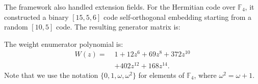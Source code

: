 The framework also handled extension fields. For the Hermitian code over $\mathbb{F}_4$, it constructed a binary $[15,5,6]$ code self-orthogonal embedding starting from a random $[10,5]$ code. The resulting generator matrix is:
\begin{center}
\end{center}
The weight enumerator polynomial is:
\begin{align*}
W(z) =\; & 1 + 12z^6 + 69z^8 + 372z^{10} \\
&+ 402z^{12} + 168z^{14}.
\end{align*}
Note that we use the notation $\{0, 1, \omega, \omega^2\}$ for elements of $\mathbb{F}_4$, where $\omega^2 = \omega + 1$.

